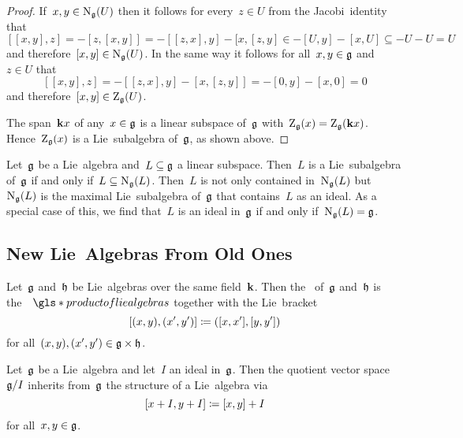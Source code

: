 \begin{proof}
 If~$x, y \in \operatorname{N}_{\mathfrak{g}}(U)$ then it follows for every~$z \in U$ from the Jacobi~identity that
 \[
  [[x,y], z]
  =
  - [z, [x,y]]
  =
  - [[z,x], y] - [x, [z,y]
  \in
  - [U, y] - [x, U]
  \subseteq
  - U - U
  =
  U
 \]
 and therefore~$[x,y] \in \operatorname{N}_{\mathfrak{g}}(U)$.
 In the same way it follows for all~$x, y \in \mathfrak{g}$ and~$z \in U$ that
 \[
  [[x,y], z]
  =
  - [[z,x], y] - [x, [z,y]]
  =
  - [0, y] - [x, 0]
  =
  0
 \]
 and therefore~$[x,y] \in \operatorname{Z}_{\mathfrak{g}}(U)$.
 
 The span~$\mathbf{k} x$ of any~$x \in \mathfrak{g}$ is a linear subspace of~$\mathfrak{g}$ with~$\operatorname{Z}_{\mathfrak{g}}(x) = \operatorname{Z}_{\mathfrak{g}}(\mathbf{k} x)$.
 Hence~$\operatorname{Z}_{\mathfrak{g}}(x)$ is a Lie~subalgebra of~$\mathfrak{g}$, as shown above.
\end{proof}


\begin{remark}
 Let~$\mathfrak{g}$ be a Lie~algebra and~$L \subseteq \mathfrak{g}$ a linear subspace.
 Then~$L$ is a Lie~subalgebra of~$\mathfrak{g}$ if and only if~$L \subseteq \operatorname{N}_{\mathfrak{g}}(L)$.
 Then~$L$ is not only contained in~$\operatorname{N}_{\mathfrak{g}}(L)$ but~$\operatorname{N}_{\mathfrak{g}}(L)$ is the maximal Lie~subalgebra of~$\mathfrak{g}$ that contains~$L$ as an ideal.
 As a special case of this, we find that~$L$ is an ideal in~$\mathfrak{g}$ if and only if~$\operatorname{N}_{\mathfrak{g}}(L) = \mathfrak{g}$.
\end{remark}





\subsection{New Lie~Algebras From Old Ones}


\begin{definition}
  Let~$\mathfrak{g}$ and~$\mathfrak{h}$ be Lie~algebras over the same field~$\kf$.
  Then the \, of~$\mathfrak{g}$ and~$\mathfrak{h}$ is the~{\vectorspace{$\kf$}}~$\gls*{product of lie algebras}$ together with the Lie~bracket
  \[
    [(x,y), (x',y')]
    \coloneqq
    ([x, x'], [y, y'])
  \]
  for all~$(x,y), (x',y') \in \mathfrak{g} \times \mathfrak{h}$.
\end{definition}


\begin{lemma}
  \label{construction of quotient lie algebra}
  Let~$\mathfrak{g}$ be a Lie~algebra and let~$I$ an ideal in~$\mathfrak{g}$.
  Then the quotient vector space~$\mathfrak{g}/I$ inherits from~$\mathfrak{g}$ the structure of a Lie~algebra via
  \[
    [x+I, y+I]
    \coloneqq
    [x,y] + I
  \]
  for all~$x, y \in \mathfrak{g}$.
\end{lemma}


